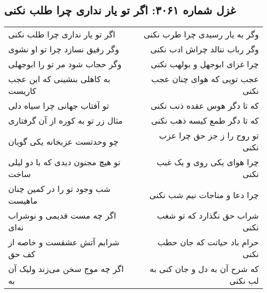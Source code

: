 \begin{center}
\section*{غزل شماره ۳۰۶۱: اگر تو یار نداری چرا طلب نکنی}
\label{sec:3061}
\begin{longtable}{l p{0.5cm} r}
اگر تو یار نداری چرا طلب نکنی
&&
وگر به یار رسیدی چرا طرب نکنی
\\
وگر رفیق نسازد چرا تو او نشوی
&&
وگر رباب ننالد چراش ادب نکنی
\\
وگر حجاب شود مر تو را ابوجهلی
&&
چرا غزای ابوجهل و بولهب نکنی
\\
به کاهلی بنشینی که این عجب کاریست
&&
عجب تویی که هوای چنان عجب نکنی
\\
تو آفتاب جهانی چرا سیاه دلی
&&
که تا دگر هوس عقده ذنب نکنی
\\
مثال زر تو به کوره از آن گرفتاری
&&
که تا دگر طمع کیسه ذهب نکنی
\\
چو وحدتست عزبخانه یکی گویان
&&
تو روح را ز جز حق چرا عزب نکنی
\\
تو هیچ مجنون دیدی که با دو لیلی ساخت
&&
چرا هوای یکی روی و یک غبب نکنی
\\
شب وجود تو را در کمین چنان ماهیست
&&
چرا دعا و مناجات نیم شب نکنی
\\
اگر چه مست قدیمی و نوشراب نه‌ای
&&
شراب حق نگذارد که تو شغب نکنی
\\
شرابم آتش عشقست و خاصه از کف حق
&&
حرام باد حیاتت که جان حطب نکنی
\\
اگر چه موج سخن می‌زند ولیک آن به
&&
که شرح آن به دل و جان کنی به لب نکنی
\\
\end{longtable}
\end{center}
